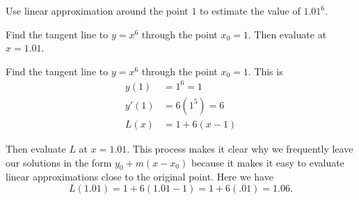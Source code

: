 \documentclass{ximera}
\author{Emma Smith Zbarsky}
\begin{document}
\begin{exercise}

Use linear approximation around the point $1$ to estimate the value of
$1.01^6$.


\begin{hint}
Find the tangent line to $y=x^6$ through the point $x_0=1$. Then
evaluate at $x=1.01$.
\end{hint}


\begin{hint}
Find the tangent line to $y=x^6$ through the point $x_0=1$. This is
\begin{align*}
y(1) &= 1^6 = 1 \\
y'(1) &= 6(1^5) = 6 \\
L(x) &= 1+6(x-1) \end{align*}

Then evaluate $L$ at $x=1.01$. This process makes it clear why we
frequently leave our solutions in the form $y_0+m(x-x_0)$ because it
makes it easy to evaluate linear approximations close to the original
point. Here we have \[L(1.01) = 1+6(1.01-1) = 1+6(.01) = 1.06.\]
\end{hint}


\begin{multipleChoice}
\end{multipleChoice}

\end{exercise}
\end{document}
